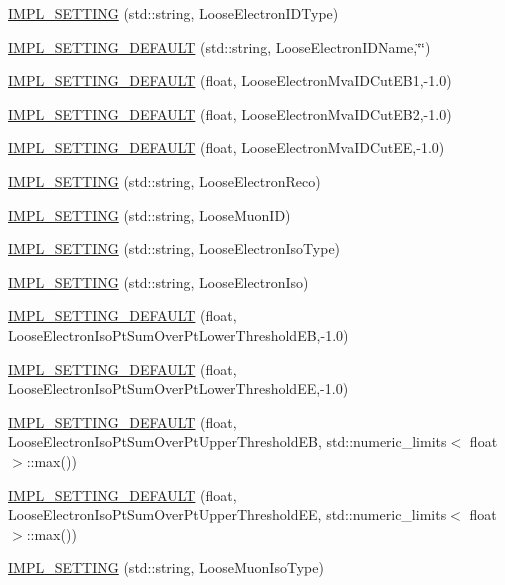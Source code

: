 \begin{DoxyCompactItemize}
\item 
\hyperlink{classHttSettings_a883fd0876b5100a04af373683acc1f25}{IMPL\_\-SETTING} (std::string, LooseElectronIDType)
\item 
\hyperlink{classHttSettings_abc7136adbfcc43f9f1c3ec25c55dfa05}{IMPL\_\-SETTING\_\-DEFAULT} (std::string, LooseElectronIDName,\char`\"{}\char`\"{})
\item 
\hyperlink{classHttSettings_aa9f8c4a76b619e9b9ef1377f4070e8c1}{IMPL\_\-SETTING\_\-DEFAULT} (float, LooseElectronMvaIDCutEB1,-\/1.0)
\item 
\hyperlink{classHttSettings_a360ed92849bfcca6dfcbf06f2915b706}{IMPL\_\-SETTING\_\-DEFAULT} (float, LooseElectronMvaIDCutEB2,-\/1.0)
\item 
\hyperlink{classHttSettings_a7472951724a2910def335470c152d36d}{IMPL\_\-SETTING\_\-DEFAULT} (float, LooseElectronMvaIDCutEE,-\/1.0)
\item 
\hyperlink{classHttSettings_ab63c978173eaa9c4d1d61c992d358e3c}{IMPL\_\-SETTING} (std::string, LooseElectronReco)
\item 
\hyperlink{classHttSettings_aff328a890479ff02d7a8c7b126da3efa}{IMPL\_\-SETTING} (std::string, LooseMuonID)
\item 
\hyperlink{classHttSettings_ae7c24618e83db51f1e860d14390b15c0}{IMPL\_\-SETTING} (std::string, LooseElectronIsoType)
\item 
\hyperlink{classHttSettings_a9ad91ad7904bcad1b441ffe3513483e8}{IMPL\_\-SETTING} (std::string, LooseElectronIso)
\item 
\hyperlink{classHttSettings_aefec965292f899d8922671e0b5932e8f}{IMPL\_\-SETTING\_\-DEFAULT} (float, LooseElectronIsoPtSumOverPtLowerThresholdEB,-\/1.0)
\item 
\hyperlink{classHttSettings_a424e01a1b5a792c2b90446e03b907680}{IMPL\_\-SETTING\_\-DEFAULT} (float, LooseElectronIsoPtSumOverPtLowerThresholdEE,-\/1.0)
\item 
\hyperlink{classHttSettings_a4f59339bd5dec544d64a5712bd410106}{IMPL\_\-SETTING\_\-DEFAULT} (float, LooseElectronIsoPtSumOverPtUpperThresholdEB, std::numeric\_\-limits$<$ float $>$::max())
\item 
\hyperlink{classHttSettings_a42aed7904ac15ac2617099a17299ec33}{IMPL\_\-SETTING\_\-DEFAULT} (float, LooseElectronIsoPtSumOverPtUpperThresholdEE, std::numeric\_\-limits$<$ float $>$::max())
\item 
\hyperlink{classHttSettings_aa8164975f425ab26101a51bf5c347b4d}{IMPL\_\-SETTING} (std::string, LooseMuonIsoType)
\item 

\end{DoxyCompactItemize}
